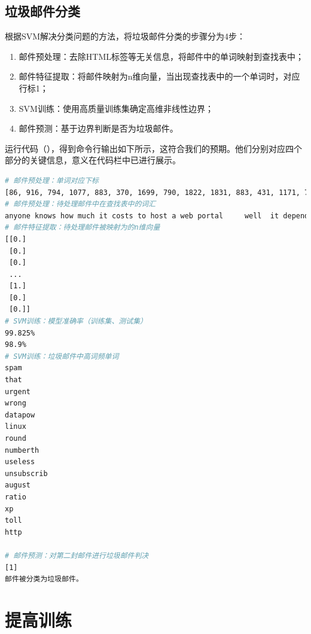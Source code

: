 \documentclass{SEU-AI-Report}
\begin{document}
\subsection{垃圾邮件分类}


根据SVM解决分类问题的方法，将垃圾邮件分类的步骤分为4步：
\begin{enumerate}
    \item 邮件预处理：去除HTML标签等无关信息，将邮件中的单词映射到查找表中；
    \item 邮件特征提取：将邮件映射为n维向量，当出现查找表中的一个单词时，对应行标1；
    \item SVM训练：使用高质量训练集确定高维非线性边界；
    \item 邮件预测：基于边界判断是否为垃圾邮件。
\end{enumerate}

运行代码（），得到命令行输出如下所示，这符合我们的预期。他们分别对应四个部分的关键信息，意义在代码栏中已进行展示。
\begin{lstlisting}[style = pythonstyle, language=bash,breaklines = true]
# 邮件预处理：单词对应下标
[86, 916, 794, 1077, 883, 370, 1699, 790, 1822, 1831, 883, 431, 1171, 794, 1002, 1893, 1364, 592, 1676, 238, 162, 89, 688, 945, 1663, 1120, 1062, 1699, 375, 1162, 479, 1893, 1510, 799, 1182, 1237, 810, 1895, 1440, 1547, 181, 1699, 1758, 1896, 688, 1676, 992, 961, 1477, 71, 530, 1699, 531]
# 邮件预处理：待处理邮件中在查找表中的词汇
anyone knows how much it costs to host a web portal     well  it depends on how many visitors you re expecting  this can be anywhere from less than number bucks a month to a couple of dollarnumber   you should checkout httpaddr or perhaps amazon ecnumber  if youre running something big    to unsubscribe yourself from this mailing list  send an email to  emailaddr  
# 邮件特征提取：待处理邮件被映射为的n维向量
[[0.]
 [0.]
 [0.]
 ...
 [1.]
 [0.]
 [0.]]
# SVM训练：模型准确率（训练集、测试集）
99.825%
98.9%
# SVM训练：垃圾邮件中高词频单词
spam
that
urgent
wrong
datapow
linux
round
numberth
useless
unsubscrib
august
ratio
xp
toll
http

# 邮件预测：对第二封邮件进行垃圾邮件判决
[1]
邮件被分类为垃圾邮件。
\end{lstlisting}
\section{提高训练}
\end{document}
